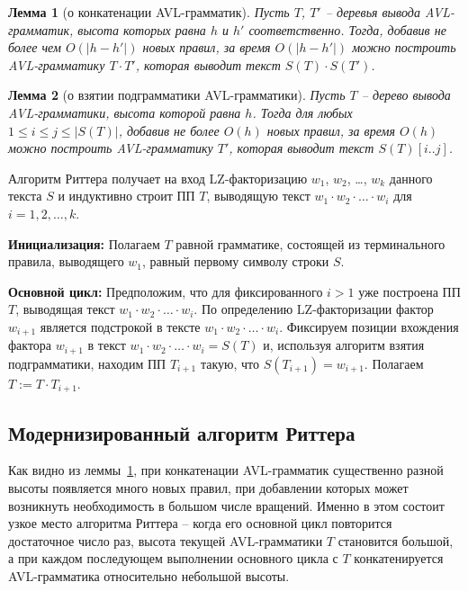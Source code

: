\documentclass[14pt]{article}
\newtheorem{lemma}{Лемма}[section]
\newcommand{\concat}[4]{
    #1_{#2} \cdot #1_{#3} \cdot \ldots \cdot #1_{#4}
}
\begin{document}
\begin{lemma}[о конкатенации AVL-грам\-ма\-тик]
\label{avl-concat-lemma}
Пусть $T$, $T'$ -- деревья вывода AVL-грамматик, высота которых равна $h$ и $h'$ соответственно. Тогда, добавив не более
чем $O\left(|h - h'|\right)$ новых правил, за время $O\left(|h - h'|\right)$ можно построить AVL-грамматику $T \cdot T'$, которая выводит текст
$S(T)\cdot S(T')$.
\end{lemma}

\begin{lemma}[о взятии подграмматики AVL-грам\-ма\-тики]
Пусть $T$ -- дерево вывода AVL-грамматики, высота которой равна $h$. Тогда для любых $1 \leq i \leq j \leq |S(T)|$,
добавив не более $O(h)$ новых правил, за время $O(h)$ можно построить AVL-грамматику $T'$, которая выводит текст $S(T)[i..j]$.
\end{lemma}

\medskip

{\sc Алгоритм Риттера} получает на вход LZ-факторизацию $w_1$, $w_2$, \dots, $w_k$ данного текста $S$ и индуктивно строит ПП $T$,
выводящую текст $\concat{w}{1}{2}{i}$ для $i=1,2,\ldots,k$.

\smallskip

\noindent\textbf{Инициализация:} Полагаем $T$ равной грамматике, состоящей из терминального правила, выводящего $w_1$, равный первому символу строки $S$.

\smallskip

\noindent\textbf{Основной цикл:} Предположим, что для фиксированного $i > 1$ уже построена ПП $T$, выводящая текст
$\concat{w}{1}{2}{i}$. По определению  LZ-факторизации фактор $w_{i+1}$ является подстрокой в тексте $\concat{w}{1}{2}{i}$. Фиксируем
позиции вхождения фактора $w_{i+1}$ в текст $\concat{w}{1}{2}{i} = S(T)$ и, используя алгоритм взятия подграмматики, находим ПП $T_{i+1}$
такую, что $S(T_{i+1}) = w_{i+1}$. Полагаем $T:=T \cdot T_{i+1}$.

\subsection{Модернизированный алгоритм Риттера}
\label{HeuricticsRytter}

Как видно из леммы~\ref{avl-concat-lemma}, при конкатенации  AVL-грам\-ма\-тик существенно разной высоты появляется много новых правил, при
добавлении которых может возникнуть необходимость в большом числе вращений. Именно в этом состоит узкое место алгоритма Риттера -- когда
его основной цикл повторится достаточное число раз, высота текущей AVL-грамматики $T$ становится большой, а при каждом последующем
выполнении основного цикла с $T$ конкатенируется AVL-грамматика относительно небольшой высоты.
\end{document}
